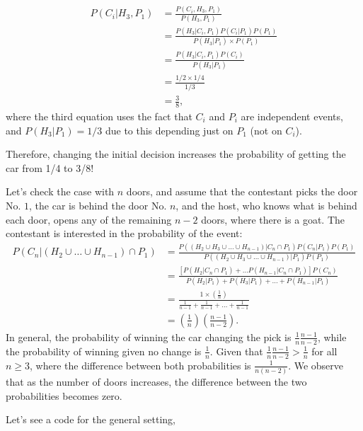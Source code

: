 \begin{enumerate}[leftmargin=*]
\begin{align}
	P(C_i|H_3,P_1)&= \frac{P(C_i,H_3,P_1)}{P(H_3,P_1)}\\
	&= \frac{P(H_3|C_i,P_1)P(C_i|P_1)P(P_1)}{P(H_3|P_1)\times P(P_1)}\nonumber\\
	&= \frac{P(H_3|C_i,P_1)P(C_i)}{P(H_3|P_1)}\nonumber\\
	&=\frac{1/2\times 1/4}{1/3}\nonumber\\
	&=\frac{3}{8},\nonumber
\end{align}
where the third equation uses the fact that $C_i$ and $P_i$ are independent events, and $P(H_3|P_1)=1/3$ due to this depending just on $P_1$ (not on $C_i$).
	
Therefore, changing the initial decision increases the probability of getting the car from 1/4 to 3/8!
	
Let's check the case with $n$ doors, and assume that the contestant picks the door No. $1$, the car is behind the door No. $n$, and the host, who knows what is behind each door, opens any of the remaining $n-2$ doors, where there is a goat. The contestant is interested in the probability of the event:
{\tiny{
\begin{align}
	P\left( C_{n} | (H_2 \cup  \ldots \cup H_{n-1}) \cap P_1 \right)  & = 
	\frac{P\left( (H_2 \cup H_3 \cup \ldots \cup H_{n-1}) | C_{n} \cap P_1\right) P(C_{n} | P_1) P(P_1)}{P\left( (H_2 \cup H_3 \cup \ldots \cup H_{n-1}) | P_1 \right) P(P_1)} \\
	& = \frac{\left[ P\left( H_2 | C_{n} \cap P_1\right) + \ldots P\left( H_{n-1}| C_{n} \cap P_1\right) \right] P(C_{n})}{P\left( H_2 | P_1 \right) + P\left( H_3 | P_1 \right) + \ldots + P\left( H_{n-1} | P_1 \right)} \nonumber\\
	& = \frac{1 \times \left( \frac{1}{n} \right) }{\frac{1}{n-1} + \frac{1}{n-1} + \ldots + \frac{1}{n-1}} \nonumber\\
	& = \left( \frac{1}{n}\right) \left( \frac{n-1}{n-2}\right).\nonumber 
\end{align}
}}	
In general, the probability of winning the car changing the pick is $\frac{1}{n} \frac{n-1}{n-2}$, while the probability of winning given no change is $\frac{1}{n}$. Given that $\frac{1}{n} \frac{n-1}{n-2} > \frac{1}{n}$ for all $n \geq 3$, where the difference between both probabilities is  $\frac{1}{n(n-2)}$. We observe that as the number of doors increases, the difference between the two probabilities becomes zero.
	
Let's see a code for the general setting,


\end{enumerate}
